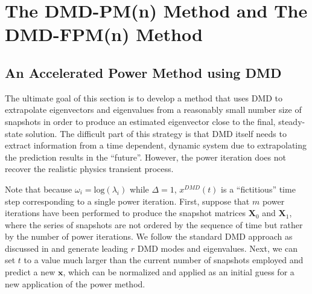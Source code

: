 \cleardoublepage

\chapter{The DMD-PM(n) Method and The DMD-FPM(n) Method}
\label{chapter:DMD-FPM(n)}

\section{An Accelerated Power Method using DMD}
\label{sec:dmdpi}
The ultimate goal of this section is to develop a method that uses DMD to extrapolate eigenvectors and eigenvalues from a reasonably small number size of snapshots in order to produce an estimated eigenvector close to the final, steady-state solution.
The difficult part of this strategy is that DMD itself needs to extract information from a time dependent, dynamic system due to extrapolating the prediction results in the ``future''.
However, the power iteration does not recover the realistic physics transient process. 

Note that because $\omega_i= \text{log}(\lambda_i)$ while $\Delta = 1$, $x^{DMD}(t)$ is a ``fictitious'' time step corresponding to a single power iteration.
First, suppose that $m$ power iterations have been performed to produce the snapshot matrices $\mathbf{X}_0$ and $\mathbf{X}_1$, where the series of snapshots are not ordered by the sequence of time but rather by the number of power iterations.
We follow the standard DMD approach as discussed in  and generate leading $r$ DMD modes and eigenvalues.
Next, we can set $t$ to a value much larger than the current number of snapshots employed and predict a new $\mathbf{x}$, which can be normalized and applied as an initial guess for a new application of the power method.

